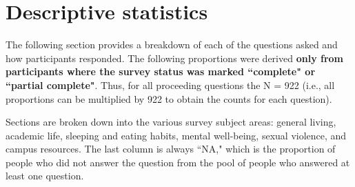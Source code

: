 \documentclass{article}\usepackage[]{graphicx}\usepackage[]{color}
\begin{document}
\pagebreak
\section{Descriptive statistics}
The following section provides a breakdown of each of the questions asked and how participants responded. The following proportions were derived \textbf{only from participants where the survey status was marked ``complete" or ``partial complete"}. Thus, for all proceeding questions the N = 922 (i.e., all proportions can be multiplied by 922 to obtain the counts for each question).

Sections are broken down into the various survey subject areas: general living, academic life, sleeping and eating habits, mental well-being, sexual violence, and campus resources. The last column is always ``NA," which is the proportion of people who did not answer the question from the pool of people who answered at least one question.
\end{document}
